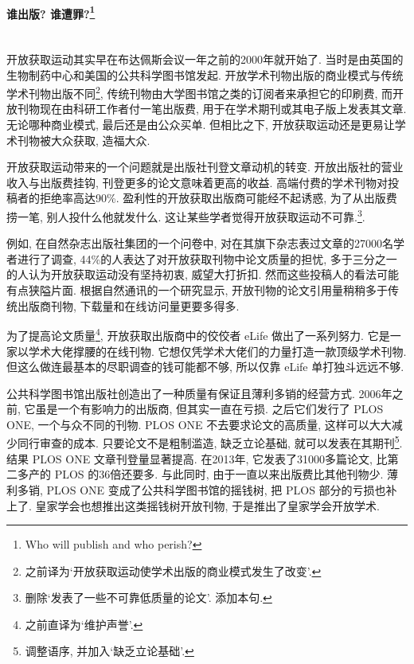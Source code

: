 \documentclass[a4paper, 12pt, UTF8]{article}
\begin{document}
\paragraph*{\large 谁出版? 谁遭罪?\footnote[4]{Who will publish and who perish?}} \hspace{10pt} \\

开放获取运动其实早在布达佩斯会议一年之前的2000年就开始了. 当时是由英国的生物制药中心和美国的公共科学图书馆发起. 开放学术刊物出版的商业模式与传统学术刊物出版不同\footnote[5]{之前译为\lq 开放获取运动使学术出版的商业模式发生了改变\rq.}, 传统刊物由大学图书馆之类的订阅者来承担它的印刷费, 而开放刊物现在由科研工作者付一笔出版费, 用于在学术期刊或其电子版上发表其文章. 无论哪种商业模式, 最后还是由公众买单. 但相比之下, 开放获取运动还是更易让学术刊物被大众获取, 造福大众.

开放获取运动带来的一个问题就是出版社刊登文章动机的转变. 开放出版社的营业收入与出版费挂钩, 刊登更多的论文意味着更高的收益. 高端付费的学术刊物对投稿者的拒绝率高达90\%. 盈利性的开放获取出版商可能经不起诱惑, 为了从出版费捞一笔, 别人投什么他就发什么. 这让某些学者觉得开放获取运动不可靠.\footnote[6]{删除\lq 发表了一些不可靠低质量的论文\rq. 添加本句.}.

例如, 在自然杂志出版社集团的一个问卷中, 对在其旗下杂志表过文章的27000名学者进行了调查, 44\%的人表达了对开放获取刊物中论文质量的担忧, 多于三分之一的人认为开放获取运动没有坚持初衷, 威望大打折扣. 然而这些投稿人的看法可能有点狭隘片面. 根据自然通讯的一个研究显示, 开放刊物的论文引用量稍稍多于传统出版商刊物, 下载量和在线访问量更要多得多.

为了提高论文质量\footnote[7]{之前直译为\lq 维护声誉\rq.}, 开放获取出版商中的佼佼者 eLife 做出了一系列努力. 它是一家以学术大佬撑腰的在线刊物. 它想仅凭学术大佬们的力量打造一款顶级学术刊物. 但这么做连最基本的尽职调查的钱可能都不够, 所以仅靠 eLife 单打独斗远远不够.

公共科学图书馆出版社创造出了一种质量有保证且薄利多销的经营方式. 2006年之前, 它虽是一个有影响力的出版商, 但其实一直在亏损. 之后它们发行了 PLOS ONE, 一个与众不同的刊物. PLOS ONE 不去要求论文的高质量, 这样可以大大减少同行审查的成本. 只要论文不是粗制滥造, 缺乏立论基础, 就可以发表在其期刊\footnote[8]{调整语序, 并加入\lq 缺乏立论基础\rq.}.  结果 PLOS ONE 文章刊登量显著提高. 在2013年, 它发表了31000多篇论文, 比第二多产的 PLOS 的36倍还要多. 与此同时, 由于一直以来出版费比其他刊物少. 薄利多销, PLOS ONE 变成了公共科学图书馆的摇钱树, 把 PLOS 部分的亏损也补上了. 皇家学会也想推出这类摇钱树开放刊物, 于是推出了皇家学会开放学术.
\end{document}

